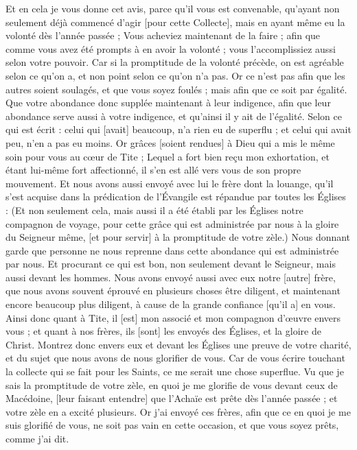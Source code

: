 \begin{multicols}{2}
Et en cela je vous donne cet avis, parce qu'il vous est convenable, qu'ayant non seulement déjà commencé d'agir [pour cette Collecte], mais en ayant même eu la volonté dès l'année passée ;
Vous acheviez maintenant de la faire ; afin que comme vous avez été prompts à en avoir la volonté ; vous l'accomplissiez aussi selon votre pouvoir.
Car si la promptitude de la volonté précède, on est agréable selon ce qu'on a, et non point selon ce qu'on n'a pas.
Or ce n'est pas afin que les autres soient soulagés, et que vous soyez foulés ; mais afin que ce soit par égalité.
Que votre abondance donc supplée maintenant à leur indigence, afin que leur abondance serve aussi à votre indigence, et qu'ainsi il y ait de l'égalité.
Selon ce qui est écrit : celui qui [avait] beaucoup, n'a rien eu de superflu ; et celui qui avait peu, n'en a pas eu moins.
Or grâces [soient rendues] à Dieu qui a mis le même soin pour vous au cœur de Tite ;
Lequel a fort bien reçu mon exhortation, et étant lui-même fort affectionné, il s'en est allé vers vous de son propre mouvement.
Et nous avons aussi envoyé avec lui le frère dont la louange, qu'il s'est acquise dans la prédication de l'Évangile est répandue par toutes les Églises :
(Et non seulement cela, mais aussi il a été établi par les Églises notre compagnon de voyage, pour cette grâce qui est administrée par nous à la gloire du Seigneur même, [et pour servir] à la promptitude de votre zèle.)
Nous donnant garde que personne ne nous reprenne dans cette abondance qui est administrée par nous.
Et procurant ce qui est bon, non seulement devant le Seigneur, mais aussi devant les hommes.
Nous avons envoyé aussi avec eux notre [autre] frère, que nous avons souvent éprouvé en plusieurs choses être diligent, et maintenant encore beaucoup plus diligent, à cause de la grande confiance [qu'il a] en vous.
Ainsi donc quant à Tite, il [est] mon associé et mon compagnon d'œuvre envers vous ; et quant à nos frères, ils [sont] les envoyés des Églises, et la gloire de Christ.
Montrez donc envers eux et devant les Églises une preuve de votre charité, et du sujet que nous avons de nous glorifier de vous.
\VerseOne{}Car de vous écrire touchant la collecte qui se fait pour les Saints, ce me serait une chose superflue.
Vu que je sais la promptitude de votre zèle, en quoi je me glorifie de vous devant ceux de Macédoine, [leur faisant entendre] que l'Achaïe est prête dès l'année passée ; et votre zèle en a excité plusieurs.
Or j'ai envoyé ces frères, afin que ce en quoi je me suis glorifié de vous, ne soit pas vain en cette occasion, et que vous soyez prêts, comme j'ai dit.

\end{multicols}
